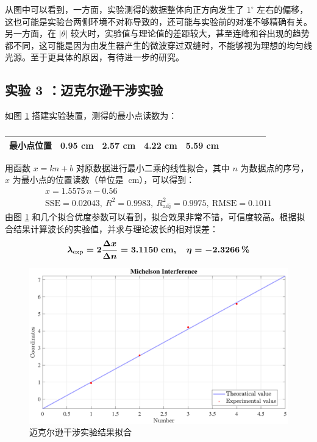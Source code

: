 \documentclass[UTF8]{article}
\theoremstyle{MyLineTheoremStyle} %
\theoremstyle{MyBlockTheoremStyle} %
\theoremstyle{MySubsubsectionStyle} %
\begin{document}
从图中可以看到，一方面，实验测得的数据整体向正方向发生了 $1^\circ$ 左右的偏移，这也可能是实验台两侧环境不对称导致的，还可能与实验前的对准不够精确有关。另一方面，在 $\left| \theta \right| $ 较大时，实验值与理论值的差距较大，甚至连峰和谷出现的趋势都不同，这可能是因为由发生器产生的微波穿过双缝时，不能够视为理想的均匀线光源。至于更具体的原因，有待进一步的研究。



\subsection{实验 3 ：迈克尔逊干涉实验}
如图 \ref{} 搭建实验装置，测得的最小点读数为：
\begin{table}[H]\centering
    \caption{}
    \label{}
\begin{tabular}{cccccccccc}\toprule
    最小点位置 & 0.95 cm & 2.57 cm & 4.22 cm & 5.59 cm \\
    \bottomrule
\end{tabular}
\end{table}
用函数 $x = kn + b$ 对原数据进行最小二乘的线性拟合，其中 $n$ 为数据点的序号，$x$ 为最小点的位置读数（单位是 $\ \mathrm{cm}$），可以得到：
\begin{gather}
x = 1.5575\, n - 0.56 \\ 
\text{SSE} = 0.02043,\  R^2 = 0.9983,\ R^2_\text{adj} = 0.9975,\   \text{RMSE} = 0.1011
\end{gather}
由图 \ref{迈克尔逊干涉实验结果拟合} 和几个拟合优度参数可以看到，拟合效果非常不错，可信度较高。根据拟合结果计算波长的实验值，并求与理论波长的相对误差：
\begin{equation}\boldmath
    \lambda_{\text{exp}} = 2 \frac{\Delta x}{\Delta n} = 3.1150 \ \mathrm{cm},\quad \eta = - 2.3266 \,\%
\end{equation}
\begin{figure}[H]\centering
    \includegraphics[width=\columnwidth]{assets/3 迈克尔/2024-11-02_17-05-08.pdf}
    \caption{迈克尔逊干涉实验结果拟合}\label{迈克尔逊干涉实验结果拟合}
\end{figure}
\end{document}
